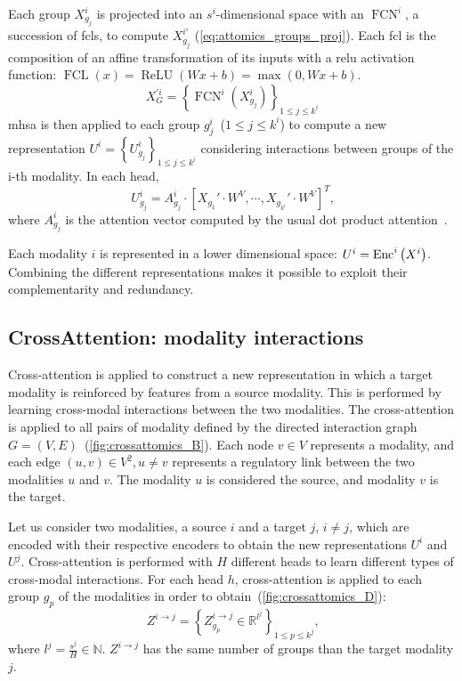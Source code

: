\documentclass[../main.tex]{subfiles}
\begin{document}
	    Each group  \(X^{i}_{g_j}\) is projected into an \(s^i\)-dimensional space with an \(\operatorname{FCN}^i\), a succession of \glspl{fcl}, to compute \(X^{i'}_{g_j}\) (\cref{eq:attomics_groups_proj}).
	    Each \gls{fcl} is the composition of an affine transformation of its inputs with a \gls{relu} activation function: \(\operatorname{FCL}\left(x\right) = \operatorname{ReLU}\left(Wx+b \right) = \max\left(0, Wx+b\right)\).
	    \begin{equation}
	        X^{'i}_{G} = \left\{\operatorname{FCN}^i\left(X^{i}_{g_j} \right) \right\}_{1\leq j\leq k^i}\label{eq:attomics_groups_proj}
	    \end{equation}
	    \Gls{mhsa} is then applied to each group \(g^i_j\)~(\(1 \leq j \leq k^i \)) to compute a new representation \({U^i = \left\{ U^i_{g_j}\right\}_{1 \leq j \leq k^i}}\) considering interactions between groups of the i-th modality.
	    In each head,
	    \begin{equation}
	        U^{i}_{g_j} = A^{i}_{g_j} \cdot \left[ X_{g_1}' \cdot W^V, \cdots ,  X_{g_{k^i}}' \cdot W^V\right]^T \text{,}\label{eq:enc_mhsa}
	    \end{equation}
	    where \(A^{i}_{g_j}\) is the attention vector computed by the usual dot product attention~\cite{AttentionAllYouNeed}.

	    Each modality \(i\) is represented in a lower dimensional space: \(U^{i} = \operatorname{Enc}^{i}\left(X^{i}\right)\).
	    Combining the different representations makes it possible to exploit their complementarity and redundancy.

	\subsection{CrossAttention: modality interactions}\label{sec:crossatt}
	    Cross-attention is applied to construct a new representation in which a target modality is reinforced by features from a source modality.
	    This is performed by learning cross-modal interactions between the two modalities.
	    The cross-attention is applied to all pairs of modality defined by the directed interaction graph \({G = \left(V,E\right)}\)~(\cref{fig:crossattomics_B}).
	    Each node \(v \in V\) represents a modality, and each edge \(\left(u,v\right) \in V^2, u\neq v\) represents a regulatory link between the two modalities \(u\) and \(v\).
	    The modality \(u\) is considered the source, and modality \(v\) is the target.

	    Let us consider two modalities, a source \(i\) and a target \(j\), \(i \neq j\), which are encoded with their respective encoders to obtain the new representations \(U^i\) and \(U^j\).
	    Cross-attention is performed with \(H\) different heads to learn different types of cross-modal interactions.
	    For each head \(h\), cross-attention is applied to each group \(g_p\) of the modalities in order to obtain~(\cref{fig:crossattomics_D}):
	    \[ Z^{i\rightarrow j} = \left\{ Z^{i\rightarrow j}_{g_p} \in \mathbb{R}^{l^j} \right\}_{1 \leq p \leq k^j}\text{,}\]
	    where \(l^j = \frac{s^j}{H} \in \mathbb{N}\).
	    \( Z^{i\rightarrow j}\) has the same number of groups than the target modality \(j\).
\end{document}
